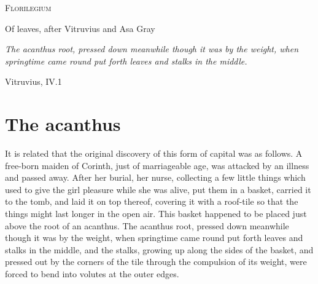 \documentclass[11pt,twoside]{article}
\begin{document}
\thispagestyle{empty}
\begin{floratitle}
\centering
{\Huge\scshape Florilegium\par}
\vspace{1.2em}
{\large Of leaves, after Vitruvius and Asa Gray\par}
\end{floratitle}
\vspace{6cm}
\begin{center}
\begin{minipage}{0.66\textwidth}
\small\itshape
The acanthus root, pressed down meanwhile though it was by the weight,
when springtime came round put forth leaves and stalks in the middle.
\par\smallskip\upshape\hfill Vitruvius, IV.1
\end{minipage}
\end{center}
\clearpage

\thispagestyle{empty}
\tableofcontents
\clearpage
\restoregeometry

\section{The acanthus}

It is related that the original discovery of this form of capital was as
follows. A free-born maiden of Corinth, just of marriageable age, was
attacked by an illness and passed away. After her burial, her nurse,
collecting a few little things which used to give the girl pleasure while
she was alive, put them in a basket, carried it to the tomb, and laid it on
top thereof, covering it with a roof-tile so that the things might last
longer in the open air. This basket happened to be placed just above the
root of an acanthus. The acanthus root, pressed down meanwhile though it was
by the weight, when springtime came round put forth leaves and stalks in the
middle, and the stalks, growing up along the sides of the basket, and
pressed out by the corners of the tile through the compulsion of its
weight, were forced to bend into volutes at the outer edges.
\end{document}
